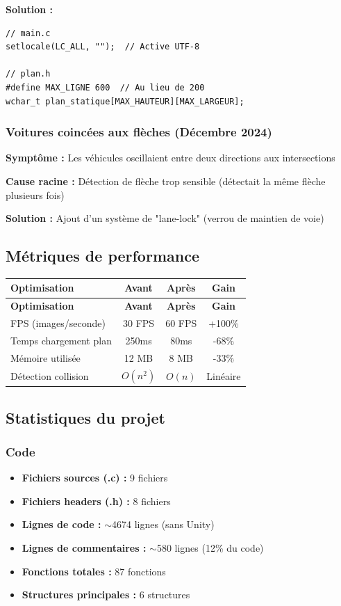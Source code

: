 \documentclass[12pt,a4paper]{article}
\begin{document}
\textbf{Solution :}
\begin{lstlisting}
// main.c
setlocale(LC_ALL, "");  // Active UTF-8

// plan.h
#define MAX_LIGNE 600  // Au lieu de 200
wchar_t plan_statique[MAX_HAUTEUR][MAX_LARGEUR];
\end{lstlisting}

\subsubsection{Voitures coincées aux flèches (Décembre 2024)}

\textbf{Symptôme :} Les véhicules oscillaient entre deux directions aux intersections

\textbf{Cause racine :} Détection de flèche trop sensible (détectait la même flèche plusieurs fois)

\textbf{Solution :} Ajout d'un système de "lane-lock" (verrou de maintien de voie)

\subsection{Métriques de performance}

\begin{longtable}{|p{5cm}|c|c|c|}
\hline
\textbf{Optimisation} & \textbf{Avant} & \textbf{Après} & \textbf{Gain} \\
\hline
\endfirsthead
\hline
\textbf{Optimisation} & \textbf{Avant} & \textbf{Après} & \textbf{Gain} \\
\hline
\endhead
\hline
\endfoot
FPS (images/seconde) & 30 FPS & 60 FPS & +100\% \\
\hline
Temps chargement plan & 250ms & 80ms & -68\% \\
\hline
Mémoire utilisée & 12 MB & 8 MB & -33\% \\
\hline
Détection collision & $O(n^2)$ & $O(n)$ & Linéaire \\
\hline
\end{longtable}

\subsection{Statistiques du projet}

\subsubsection{Code}
\begin{itemize}
    \item \textbf{Fichiers sources (.c) :} 9 fichiers
    \item \textbf{Fichiers headers (.h) :} 8 fichiers
    \item \textbf{Lignes de code :} $\sim$4674 lignes (sans Unity)
    \item \textbf{Lignes de commentaires :} $\sim$580 lignes (12\% du code)
    \item \textbf{Fonctions totales :} 87 fonctions
    \item \textbf{Structures principales :} 6 structures
\end{itemize}
\end{document}
